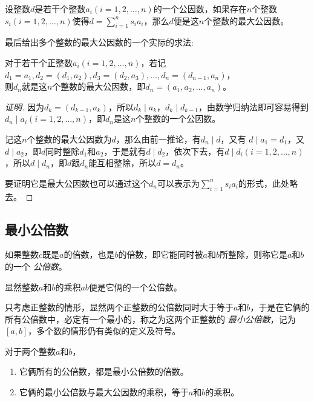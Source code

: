 \begin{theorem}
  设整数$d$是若干个整数$a_i(i=1,2,\ldots,n)$的一个公因数，如果存在$n$个整数$s_i(i=1,2,\ldots,n)$使得$d=\sum_{i=1}^n s_ia_i$，那么$d$便是这$n$个整数的最大公因数。
\end{theorem}

最后给出多个整数的最大公因数的一个实际的求法:
\begin{theorem}
  对于若干个正整数$a_i(i=1,2,\ldots,n)$，若记$d_1=a_1, d_2=(d_1,a_2), d_3=(d_2, a_3),\ldots,d_n=(d_{n-1},a_n)$，\\则$d_n$就是这$n$个整数的最大公因数，即$d_n=(a_1,a_2,\ldots,a_n)$。
\end{theorem}

\begin{proof}[证明]
  因为$d_k=(d_{k-1},a_k)$，所以$d_k \mid a_k$，$d_k \mid d_{k-1}$，由数学归纳法即可容易得到$d_n \mid a_i(i=1,2,\dots,n)$，即$d_n$是这$n$个整数的一个公因数。

  记这$n$个整数的最大公因数为$d$，那么由前一推论，有$d_n \mid d$，又有 $d \mid a_1=d_1$，又$d \mid a_2$，即$d$同时整除$d_1$和$a_2$，于是就有$d \mid d_2$，依次下去，有$d \mid d_i(i=1,2,\ldots,n)$，所以$d \mid d_n$，即$d$跟$d_n$能互相整除，所以$d=d_n$。

  要证明它是最大公因数也可以通过这个$d_n$可以表示为$\sum_{i=1}^n s_ia_i$的形式，此处略去。
\end{proof}

\subsection{最小公倍数}
\label{sec:least-common-multiple}

\begin{definition}
  如果整数$c$既是$a$的倍数，也是$b$的倍数，即它能同时被$a$和$b$所整除，则称它是$a$和$b$的一个 \emph{公倍数}。
\end{definition}
显然整数$a$和$b$的乘积$ab$便是它俩的一个公倍数。

只考虑正整数的情形，显然两个正整数的公倍数同时大于等于$a$和$b$，于是在它俩的所有公倍数中，必定有一个最小的，称之为这两个正整数的 \emph{最小公倍数}，记为$[a,b]$，多个数的情形仍有类似的定义及符号。

\begin{theorem}
  对于两个整数$a$和$b$，
  \begin{enumerate}
  \item 它俩所有的公倍数，都是最小公倍数的倍数。
  \item 它俩的最小公倍数与最大公因数的乘积，等于$a$和$b$的乘积。
  \end{enumerate}
\end{theorem}

